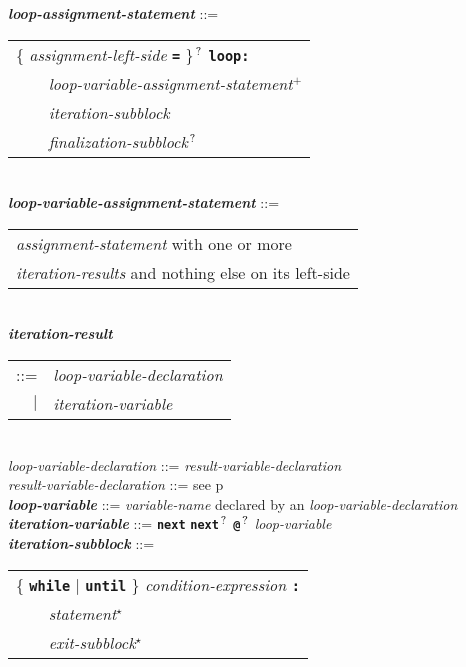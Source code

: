 \documentclass[12pt]{article}
\newcommand{\TT}[1]{{\tt \bfseries #1}}
\newcommand{\STAR}{{\Large $^\star$}}
\newcommand{\PLUS}[1][]{{$^{+#1}$}}
\newcommand{\QMARK}{{$^{\,\mbox{\footnotesize ?}}$}}
\newcommand{\ttkey}[1]{{\tt \bfseries #1}}
\newcommand{\emkey}[1]{{\em \bfseries #1}}
\newcommand{\pagref}[1]{p\pageref{#1}}
\newenvironment{indpar}[1][0.3in]%
	{\begin{list}{}%
		     {\setlength{\itemsep}{0in}%
		      \setlength{\topsep}{0in}%
		      \setlength{\parsep}{1ex}%
		      \setlength{\labelwidth}{#1}%
		      \setlength{\leftmargin}{#1}%
		      \addtolength{\leftmargin}{\labelsep}}%
	 \item}%
	{\end{list}}
\begin{document}
\begin{indpar}
\emkey{loop-assignment-statement} ::= \\
\hspace*{0.5in}\begin{tabular}[t]{l}
        \{ {\em assignment-left-side} \TT{=} \}\QMARK{} \ttkey{loop}\TT{:} \\
	\TT{~~~~}{\em loop-variable-assignment-statement}\PLUS{} \\
	\TT{~~~~}{\em iteration-subblock} \\
	\TT{~~~~}{\em finalization-subblock}\QMARK{} \\
	\end{tabular}
\\[0.5ex]
\emkey{loop-variable-assignment-statement} ::= \\
\hspace*{0.5in}\begin{tabular}[t]{l}
	{\em assignment-statement} with one or more \\
	{\em iteration-results} and nothing else on its left-side
	\end{tabular} \\
\emkey{iteration-result}
    \begin{tabular}[t]{rl}
    ::= & {\em loop-variable-declaration} \\
    $|$ & {\em iteration-variable} \\
    \end{tabular} \\
{\em loop-variable-declaration} ::= {\em result-variable-declaration} \\
{\em result-variable-declaration} ::=
    see \pagref{RESULT-VARIABLE-DECLARATION}
\\[0.5ex]
\emkey{loop-variable} ::=
    {\em variable-name} declared by an {\em loop-variable-declaration}
\\[0.5ex]
\emkey{iteration-variable}\label{ITERATION-VARIABLE} ::= 
    \TT{next} \TT{next}\QMARK{} \TT{@}\QMARK{} {\em loop-variable}
\\[0.5ex]
\emkey{iteration-subblock} ::= \\
\hspace*{0.5in}\begin{tabular}[t]{l}
        \{ \ttkey{while} $|$ \ttkey{until} \}
	    {\em condition-expression} \TT{:} \\
	\TT{~~~~}{\em statement}\STAR{} \\
	\TT{~~~~}{\em exit-subblock}\STAR{} \\
	\end{tabular}

\end{indpar}
\end{document}
